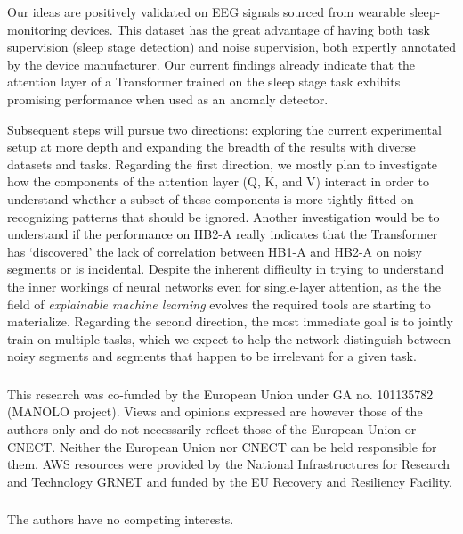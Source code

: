\documentclass[runningheads]{llncs}
\begin{document}
Our ideas are positively validated on EEG signals sourced from
wearable sleep-monitoring devices. This dataset has the great
advantage of having both task supervision (sleep stage detection) and
noise supervision, both expertly annotated by the device manufacturer.
Our current findings already indicate that the attention layer of a
Transformer trained on the sleep stage task exhibits promising
performance when used as an anomaly detector.

Subsequent steps will pursue two directions: exploring the current
experimental setup at more depth and expanding the breadth of the
results with diverse datasets and tasks. Regarding the first direction,
we mostly plan to investigate how the components of the attention
layer (Q, K, and V) interact in order to understand whether a subset 
of these components is more tightly fitted on
recognizing patterns that should be ignored. Another investigation
would be to understand if the performance on HB2-A really indicates
that the Transformer has `discovered' the lack of correlation between
HB1-A and HB2-A on noisy segments or is incidental. Despite the
inherent difficulty in trying to understand the inner workings of
neural networks even for single-layer attention, as the the field
of \emph{explainable machine learning} evolves the required tools
are starting to materialize.
%
Regarding the second direction, the most immediate goal is to jointly
train on multiple tasks, which we expect to help the network
distinguish between noisy segments and segments that happen to be
irrelevant for a given task.


\begin{credits}
  
\subsubsection{\ackname} This research was co-funded by the European Union
under GA no. 101135782 (MANOLO project). Views and opinions expressed
are however those of the authors only and do not necessarily reflect
those of the European Union or CNECT. Neither the European Union nor
CNECT can be held responsible for them. AWS resources were provided by
the National Infrastructures for Research and Technology GRNET and
funded by the EU Recovery and Resiliency Facility.

\subsubsection{\discintname} The authors have no competing
interests.
\end{credits}




\end{document}
